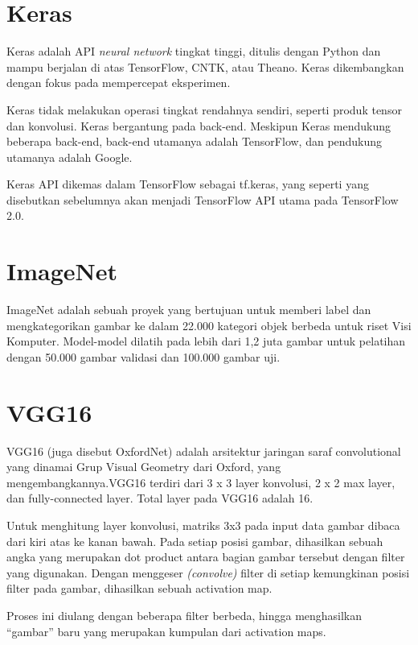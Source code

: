 \section{Keras}
\par Keras adalah API \textit{neural network} tingkat tinggi, ditulis dengan Python dan mampu berjalan di atas TensorFlow, CNTK, atau Theano. Keras dikembangkan dengan fokus pada mempercepat eksperimen\cite{keras_def}.
\par Keras tidak melakukan operasi tingkat rendahnya sendiri, seperti produk tensor dan konvolusi. Keras bergantung pada back-end. Meskipun Keras mendukung beberapa back-end, back-end utamanya adalah TensorFlow, dan pendukung utamanya adalah Google. 
\par Keras API dikemas dalam TensorFlow sebagai tf.keras, yang seperti yang disebutkan sebelumnya akan menjadi TensorFlow API utama pada TensorFlow 2.0.

\section{ImageNet}
\par ImageNet adalah sebuah proyek yang bertujuan untuk memberi label dan mengkategorikan gambar ke dalam 22.000 kategori objek berbeda untuk riset Visi Komputer. Model-model dilatih pada lebih dari 1,2 juta gambar untuk pelatihan dengan 50.000 gambar validasi dan 100.000 gambar uji\cite{vgg19_def}.

\section{VGG16} 
\par VGG16 (juga disebut OxfordNet) adalah arsitektur jaringan saraf convolutional yang dinamai Grup Visual Geometry dari Oxford, yang mengembangkannya.VGG16 terdiri dari 3 x 3 layer konvolusi, 2 x 2 max layer, dan fully-connected layer. Total layer pada VGG16 adalah 16\cite{vgg16_def}.

\par Untuk menghitung layer konvolusi, matriks 3x3 pada input data gambar dibaca dari kiri atas ke kanan bawah. 
Pada setiap posisi gambar, dihasilkan sebuah angka yang merupakan dot product antara bagian gambar tersebut dengan filter yang digunakan. Dengan menggeser \textit{(convolve)} filter di setiap kemungkinan posisi filter pada gambar, dihasilkan sebuah activation map.

\par Proses ini diulang dengan beberapa filter berbeda, hingga menghasilkan “gambar” baru yang merupakan kumpulan dari activation maps.


